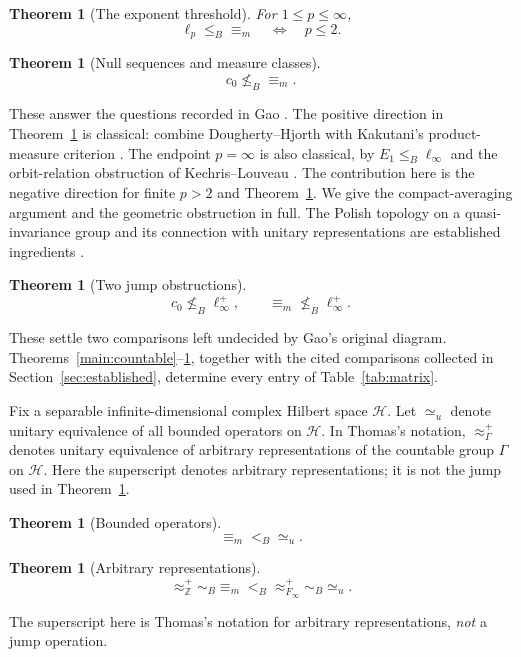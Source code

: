 \documentclass[11pt]{article}
\numberwithin{equation}{section}
\newtheorem{maintheorem}[theorem]{Theorem}
\theoremstyle{definition}
\newcommand{\Z}{\mathbb Z}
\begin{document}
\begin{maintheorem}[The exponent threshold]\label{main:lp}
For $1\leq p\leq\infty$,
\[
 \ell_p\leq_B{\equiv_m}\quad\Longleftrightarrow\quad p\leq2.
\]
\end{maintheorem}
\begin{maintheorem}[Null sequences and measure classes]\label{main:c0}
\[c_0\nleq_B{\equiv_m}.\]
\end{maintheorem}
These answer the questions recorded in Gao
\cite[Section~8.5, p.~200; Section~15.2, p.~349]{Gao}.
The positive direction in Theorem~\ref{main:lp} is classical:
combine Dougherty--Hjorth with Kakutani's product-measure criterion
\cite{DH,Kakutani}. The endpoint $p=\infty$ is also classical,
by $E_1\leq_B\ell_\infty$ and the orbit-relation obstruction
of Kechris--Louveau \cite{KL}. The contribution here is the negative
direction for finite $p>2$ and Theorem~\ref{main:c0}.
We give the compact-averaging argument and
the geometric obstruction in full. The Polish topology on a
quasi-invariance group and its connection with unitary representations
are established ingredients \cite{HMP,Gabri06}.

\begin{maintheorem}[Two jump obstructions]\label{main:jumps}
\[
 c_0\nleq_B\ell_\infty^+,
 \qquad {\equiv_m}\nleq_B\ell_\infty^+.
\]
\end{maintheorem}
These settle two comparisons left undecided by Gao's original diagram.
Theorems~\ref{main:countable}--\ref{main:jumps},
together with the cited comparisons collected in
Section~\ref{sec:established}, determine every entry of
Table~\ref{tab:matrix}.

Fix a separable infinite-dimensional complex Hilbert space
$\mathcal H$. Let $\simeq_u$ denote unitary equivalence of all bounded
operators on $\mathcal H$. In Thomas's notation,
$\approx_\Gamma^+$ denotes unitary equivalence of arbitrary
representations of the countable group $\Gamma$ on $\mathcal H$.
Here the superscript denotes arbitrary representations; it is not
the jump used in Theorem~\ref{main:jumps}.
\begin{maintheorem}[Bounded operators]\label{main:operators}
\[{\equiv_m}<_B{\simeq_u}.\]
\end{maintheorem}
\begin{maintheorem}[Arbitrary representations]\label{main:thomas}
\[
 {\approx^+_{\Z}}\sim_B{\equiv_m}
 <_B{\approx^+_{F_\infty}}\sim_B{\simeq_u}.
\]
\end{maintheorem}

The superscript here is
Thomas's notation for arbitrary representations, \emph{not} a jump operation.
\end{document}
